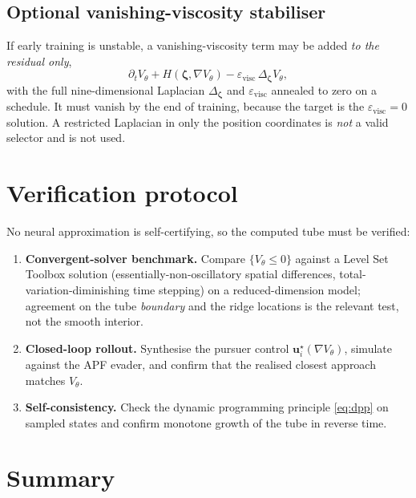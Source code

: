 \documentclass[11pt]{article}
\newcommand{\zbf}{\bm{\zeta}}
\newcommand{\ubf}{\bm{u}}
\begin{document}
\subsection{Optional vanishing-viscosity stabiliser}

If early training is unstable, a vanishing-viscosity term may be added \emph{to the residual only},
\begin{equation}
\partial_tV_\theta+H(\zbf,\nabla V_\theta)-\varepsilon_{\mathrm{visc}}\,\Delta_{\zbf}V_\theta,
\end{equation}
with the full nine-dimensional Laplacian $\Delta_{\zbf}$ and $\varepsilon_{\mathrm{visc}}$ annealed
to zero on a schedule. It must vanish by the end of training, because the target is the
$\varepsilon_{\mathrm{visc}}=0$ solution. A restricted Laplacian in only the position coordinates is
\emph{not} a valid selector and is not used.

\section{Verification protocol}

No neural approximation is self-certifying, so the computed tube must be verified:
\begin{enumerate}[nosep]
\item \textbf{Convergent-solver benchmark.} Compare $\{V_\theta\le0\}$ against a Level Set Toolbox
solution (essentially-non-oscillatory spatial differences, total-variation-diminishing time
stepping) on a reduced-dimension model; agreement on the tube \emph{boundary} and the ridge
locations is the relevant test, not the smooth interior.
\item \textbf{Closed-loop rollout.} Synthesise the pursuer control $\ubf_i^\star(\nabla V_\theta)$,
simulate against the APF evader, and confirm that the realised closest approach matches $V_\theta$.
\item \textbf{Self-consistency.} Check the dynamic programming principle \eqref{eq:dpp} on sampled
states and confirm monotone growth of the tube in reverse time.
\end{enumerate}

\section{Summary}
\end{document}
